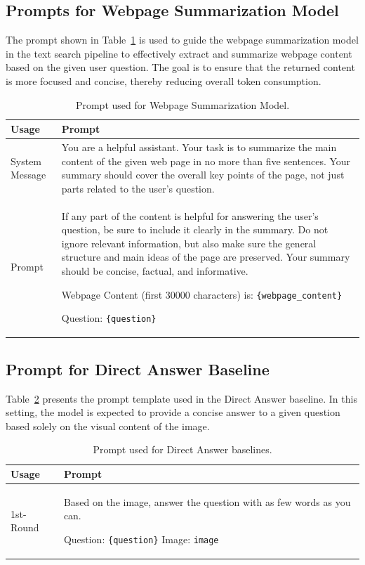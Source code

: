 \documentclass{article}
\begin{document}
\subsection{Prompts for Webpage Summarization Model}
\label{appendix:web-summary-prompts}
The prompt shown in Table~\ref{tab:webpage-summary-prompt} is used to guide the webpage summarization model in the text search pipeline to effectively extract and summarize webpage content based on the given user question. The goal is to ensure that the returned content is more focused and concise, thereby reducing overall token consumption.

\begin{table}[t]
\centering
\caption{Prompt used for Webpage Summarization Model.}
\label{tab:webpage-summary-prompt}
\begin{tabular}{p{1cm}|p{12cm}}
\toprule
\textbf{Usage} & \textbf{Prompt} \\ \midrule
System Message & You are a helpful assistant. Your task is to summarize the main content of the given web page in no more than five sentences. Your summary should cover the overall key points of the page, not just parts related to the user's question. \\ \midrule
Prompt & If any part of the content is helpful for answering the user's question, be sure to include it clearly in the summary. Do not ignore relevant information, but also make sure the general structure and main ideas of the page are preserved. Your summary should be concise, factual, and informative. 

Webpage Content (first 30000 characters) is: \texttt{\{webpage\_content\}}

Question: \texttt{\{question\}}
\\ \bottomrule
\end{tabular}
\end{table}

\subsection{Prompt for Direct Answer Baseline}
\label{appendix:direct-answer-prompts}
Table~\ref{tab:direct-answer-prompt} presents the prompt template used in the Direct Answer baseline. In this setting, the model is expected to provide a concise answer to a given question based solely on the visual content of the image.

\begin{table}[t]
\centering
\caption{Prompt used for Direct Answer baselines.}
\label{tab:direct-answer-prompt}
\begin{tabular}{p{1cm}|p{12cm}}
\toprule
\textbf{Usage} & \textbf{Prompt} \\ \midrule
1st-Round & Based on the image, answer the question with as few words as you can. 

Question: \texttt{\{question\}} Image: \texttt{image}
\\ \bottomrule
\end{tabular}
\end{table}
\end{document}
